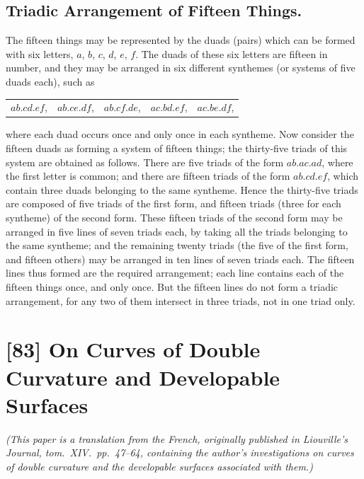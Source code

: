 \documentclass[11pt,a4paper]{book}
\begin{document}
\subsection*{Triadic Arrangement of Fifteen Things.}

The fifteen things may be represented by the duads (pairs) which can be formed with six letters, $a$, $b$, $c$, $d$, $e$, $f$. The duads of these six letters are fifteen in number, and they may be arranged in six different synthemes (or systems of five duads each), such as
\begin{center}
\begin{tabular}{lllll}
$ab.cd.ef$, & $ab.ce.df$, & $ab.cf.de$, & $ac.bd.ef$, & $ac.be.df$,
\end{tabular}
\end{center}
where each duad occurs once and only once in each syntheme. Now consider the fifteen duads as forming a system of fifteen things; the thirty-five triads of this system are obtained as follows. There are five triads of the form $ab.ac.ad$, where the first letter is common; and there are fifteen triads of the form $ab.cd.ef$, which contain three duads belonging to the same syntheme. Hence the thirty-five triads are composed of five triads of the first form, and fifteen triads (three for each syntheme) of the second form. These fifteen triads of the second form may be arranged in five lines of seven triads each, by taking all the triads belonging to the same syntheme; and the remaining twenty triads (the five of the first form, and fifteen others) may be arranged in ten lines of seven triads each. The fifteen lines thus formed are the required arrangement; each line contains each of the fifteen things once, and only once. But the fifteen lines do not form a triadic arrangement, for any two of them intersect in three triads, not in one triad only.

\newpage
\section*{[83] On Curves of Double Curvature and Developable Surfaces}

\bigskip

\noindent\textit{(This paper is a translation from the French, originally published in Liouville's Journal, tom.~XIV.\ pp.~47--64, containing the author's investigations on curves of double curvature and the developable surfaces associated with them.)}
\end{document}
